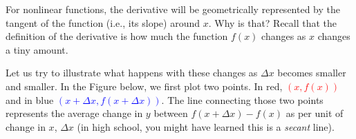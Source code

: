 \documentclass[11pt,letterpaper]{article}
\begin{document}
\begin{center}
    
\end{center}

For nonlinear functions, the derivative will be geometrically represented by the tangent of the function (i.e., its slope) around $x$. Why is that? Recall that the definition of the derivative is how much the function $f(x)$ changes as $x$ changes a tiny amount.

Let us try to illustrate what happens with these changes as $\Delta x$ becomes smaller and smaller. In the Figure below, we first plot two points. In red, \textcolor{red}{$(x,f(x))$} and in blue \textcolor{blue}{$(x + \Delta x,f(x + \Delta x))$}. The line connecting those two points represents the average change in $y$ between $f(x + \Delta x) - f(x)$ as per unit of change in $x$, $\Delta x$ (in high school, you might have learned this is a \textit{secant} line).
\end{document}
